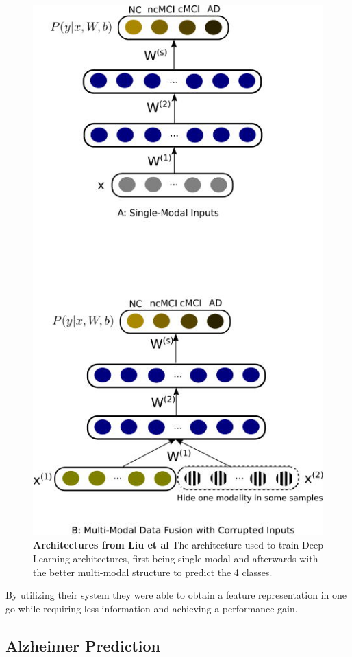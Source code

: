 \begin{figure}[th]
\centerline{\includegraphics{images/background/gr3.jpg}}
\caption{{\bf Architectures from Liu et al\cite{Liu2015}}{ The architecture used to train Deep Learning architectures, first being single-modal and afterwards with the better multi-modal structure to predict the 4 classes.}}
\label{gr3}
\end{figure}

By utilizing their system they were able to obtain a feature representation in one go while requiring less information and achieving a performance gain.
\newpage
\subsection{Alzheimer Prediction}

